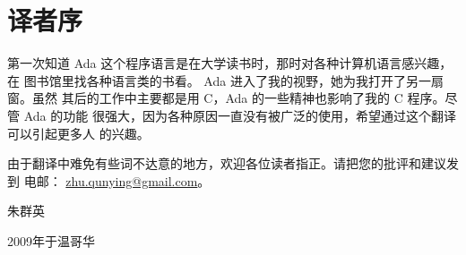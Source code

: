 %
%
%

\chapter{译者序}
\pagestyle{empty}

第一次知道 Ada 这个程序语言是在大学读书时，那时对各种计算机语言感兴趣，在
图书馆里找各种语言类的书看。 Ada 进入了我的视野，她为我打开了另一扇窗。虽然
其后的工作中主要都是用 C，Ada 的一些精神也影响了我的 C 程序。尽管 Ada 的功能
很强大，因为各种原因一直没有被广泛的使用，希望通过这个翻译可以引起更多人
的兴趣。

 
由于翻译中难免有些词不达意的地方，欢迎各位读者指正。请把您的批评和建议发到
电邮： \url{zhu.qunying@gmail.com}。


\vspace{5em}
\begin{flushright}
朱群英

2009年于温哥华
\end{flushright}


